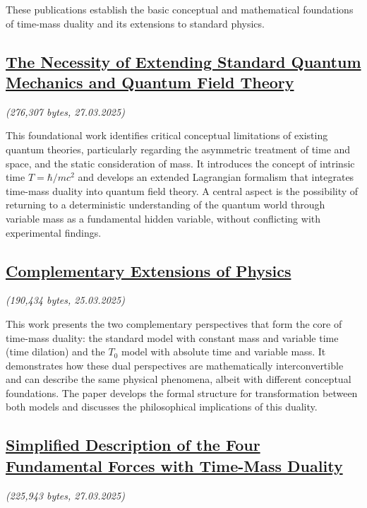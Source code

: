 \documentclass[a4paper,12pt]{article}
\newcommand{\repobase}{https://github.com/jpascher/T0-Time-Mass-Duality/tree/main/2/}
\begin{document}
	These publications establish the basic conceptual and mathematical foundations of time-mass duality and its extensions to standard physics.
	
	\subsection{\href{\repobase pdf/English/The Necessity of Extending Standard Quantum Mechanics and Quantum Field Theory.pdf}{The Necessity of Extending Standard Quantum Mechanics and Quantum Field Theory}}
	\textit{(276,307 bytes, 27.03.2025)}
	
	This foundational work identifies critical conceptual limitations of existing quantum theories, particularly regarding the asymmetric treatment of time and space, and the static consideration of mass. It introduces the concept of intrinsic time $T = \hbar/mc^2$ and develops an extended Lagrangian formalism that integrates time-mass duality into quantum field theory. A central aspect is the possibility of returning to a deterministic understanding of the quantum world through variable mass as a fundamental hidden variable, without conflicting with experimental findings.
	
	\subsection{\href{\repobase pdf/English/complementary-extensions.pdf}{Complementary Extensions of Physics}}
	\textit{(190,434 bytes, 25.03.2025)}
	
	This work presents the two complementary perspectives that form the core of time-mass duality: the standard model with constant mass and variable time (time dilation) and the $T_0$ model with absolute time and variable mass. It demonstrates how these dual perspectives are mathematically interconvertible and can describe the same physical phenomena, albeit with different conceptual foundations. The paper develops the formal structure for transformation between both models and discusses the philosophical implications of this duality.
	
	\subsection{\href{\repobase pdf/English/Simplified Description of the Four Fundamental Forces with Time-Mass Duality.pdf}{Simplified Description of the Four Fundamental Forces with Time-Mass Duality}}
	\textit{(225,943 bytes, 27.03.2025)}
	
\end{document}
